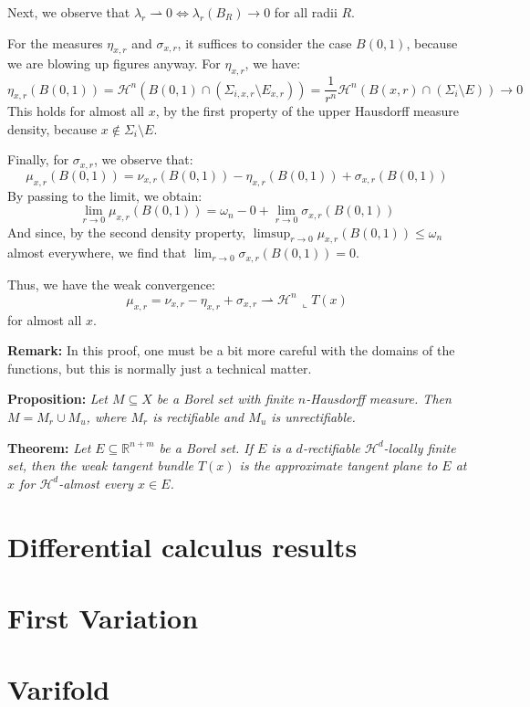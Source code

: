 \documentclass{article}
\begin{document}
\vspace{1ex}
Next, we observe that $\lambda_r\rightharpoonup 0\Leftrightarrow \lambda_r(B_R)\rightarrow 0$ for all radii $R$.

\vspace{1ex}
For the measures $\eta_{x,r}$ and $\sigma_{x,r}$, it suffices to consider the case $B(0,1)$, because we are blowing up figures anyway. For $\eta_{x,r}$, we have:
\[\eta_{x,r}(B(0, 1))=\mathcal H^n(B(0, 1)\cap(\Sigma_{i,x,r}\setminus E_{x,r}))=
\frac{1}{r^n}\mathcal H^n(B(x,r)\cap(\Sigma_i\setminus E))\rightarrow 0\]
This holds for almost all $x$, by the first property of the upper Hausdorff measure density, because $x \notin \Sigma_i \setminus E$.

\vspace{1ex}
Finally, for $\sigma_{x,r}$, we observe that:
\[\mu_{x,r}(B(0,1))=\nu_{x,r}(B(0,1))-\eta_{x,r}(B(0,1))+\sigma_{x,r}(B(0,1))\]
By passing to the limit, we obtain:
\[\lim_{r\to 0}\mu_{x,r}(B(0,1))=\omega_n-0+\lim_{r\to 0}\sigma_{x,r}(B(0,1))\]
And since, by the second density property, $\limsup_{r\to 0}\mu_{x,r}(B(0,1)) \le \omega_n$ almost everywhere, we find that $\lim_{r\to 0}\sigma_{x,r}(B(0,1))=0$.

Thus, we have the weak convergence:
\[\mu_{x,r}=\nu_{x,r}-\eta_{x,r}+\sigma_{x,r}\rightharpoonup\mathcal H^n\,\llcorner T(x)\]
for almost all $x$.

\vspace{1ex}
\textbf{Remark:} In this proof, one must be a bit more careful with the domains of the functions, but this is normally just a technical matter.

\vspace{2ex}
\textbf{Proposition:} \textit{Let $M\subseteq X$ be a Borel set with finite
$n$-Hausdorff measure. Then $M=M_r\cup M_u$, where $M_r$ is rectifiable
and $M_u$ is unrectifiable.}

\vspace{2ex}
\textbf{Theorem:} \textit{Let $E\subseteq\mathbb R^{n+m}$ be a Borel set. If $E$
is a $d$-rectifiable $\mathcal H^d$-locally finite set, then the weak tangent
bundle $T(x)$ is the approximate tangent plane to $E$ at $x$ for $\mathcal H^d$-almost
every $x\in E$.}

\section{Differential calculus results}


\section{First Variation}


\section{Varifold}


\medskip


\end{document}
